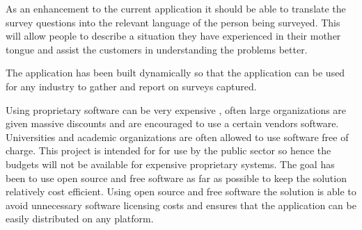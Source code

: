 \documentclass[12pt]{witseiepaper}
\begin{document}
As an enhancement to the current application it should be able to translate the survey questions into the relevant language of the person being surveyed. This will allow people to describe a situation they have experienced in their mother tongue and assist the customers in understanding the problems better.

The application has been built dynamically so that the application can be used for any industry to gather and report on surveys captured. 

Using proprietary software can be very expensive , often large organizations are given massive discounts and are encouraged to use a certain vendors software. Universities and academic organizations are often allowed to use software free of charge.
This project is intended for for use by the public sector so hence the budgets will not be available for expensive proprietary systems. The goal has been to use open source and free software as far as possible to keep the solution relatively cost efficient. Using open source and free software the solution is able to avoid unnecessary software licensing costs and ensures that the application can be easily distributed on any platform.









\end{document}
